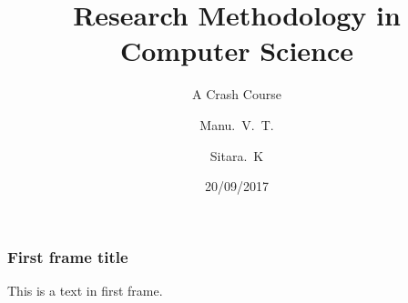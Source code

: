 \documentclass{beamer}
\title{Research Methodology in Computer Science}
\subtitle{A Crash Course}
\author{Manu.~V.~T.\inst{1} \and Sitara.~K\inst{2}}
\institute
{
  \inst{1}%
	IDRBT\\
	Hyderabad
  \and
  \inst{2}%
  SCIS\\
  University of Hyderabad
}
\date{20/09/2017}
\begin{document}
\frame{\titlepage}
\begin{frame}
\frametitle{First frame title}
This is a text in first frame. 
\end{frame}
\end{document}
